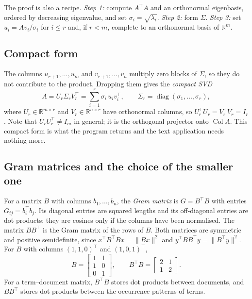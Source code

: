 \documentclass[12pt,a4paper]{report}
\newcommand{\R}{\mathbb{R}}
\newcommand{\norm}[1]{\lVert #1\rVert}
\newcommand{\T}{^{\top}}
\DeclareMathOperator{\Col}{Col}
\DeclareMathOperator{\diag}{diag}
\theoremstyle{plain}
\theoremstyle{definition}
\theoremstyle{remark}
\theoremstyle{definition}
\begin{document}
The proof is also a recipe. \emph{Step 1:} compute $A\T A$ and an orthonormal eigenbasis, ordered by decreasing eigenvalue, and set $\sigma_i=\sqrt{\lambda_i}$. \emph{Step 2:} form $\Sigma$. \emph{Step 3:} set $u_i=Av_i/\sigma_i$ for $i\le r$ and, if $r<m$, complete to an orthonormal basis of $\R^m$.

\subsection{Compact form}

The columns $u_{r+1},\dots,u_m$ and $v_{r+1},\dots,v_n$ multiply zero blocks of $\Sigma$, so they do not contribute to the product. Dropping them gives the \emph{compact SVD}
\begin{equation}\label{eq:compact}
A=U_r\Sigma_rV_r\T=\sum_{i=1}^r\sigma_i\,u_iv_i\T,\qquad \Sigma_r=\diag(\sigma_1,\dots,\sigma_r),
\end{equation}
where $U_r\in\R^{m\times r}$ and $V_r\in\R^{n\times r}$ have orthonormal columns, so $U_r\T U_r=V_r\T V_r=I_r$. Note that $U_rU_r\T\ne I_m$ in general; it is the orthogonal projector onto $\Col A$. This compact form is what the program returns and the text application needs nothing more.

\subsection{Gram matrices and the choice of the smaller one}\label{sec:gram}

For a matrix $B$ with columns $b_1,\dots,b_n$, the \emph{Gram matrix} is $G=B\T B$ with entries $G_{ij}=b_i\T b_j$. Its diagonal entries are squared lengths and its off-diagonal entries are dot products; they are cosines only if the columns have been normalised. The matrix $BB\T$ is the Gram matrix of the rows of $B$. Both matrices are symmetric and positive semidefinite, since $x\T B\T Bx=\norm{Bx}^2$ and $y\T BB\T y=\norm{B\T y}^2$. For $B$ with columns $(1,1,0)\T$ and $(1,0,1)\T$,
\[
B=\begin{bmatrix}1&1\\1&0\\0&1\end{bmatrix},\qquad B\T B=\begin{bmatrix}2&1\\1&2\end{bmatrix}.
\]
For a term--document matrix, $B\T B$ stores dot products between documents, and $BB\T$ stores dot products between the occurrence patterns of terms.
\end{document}
